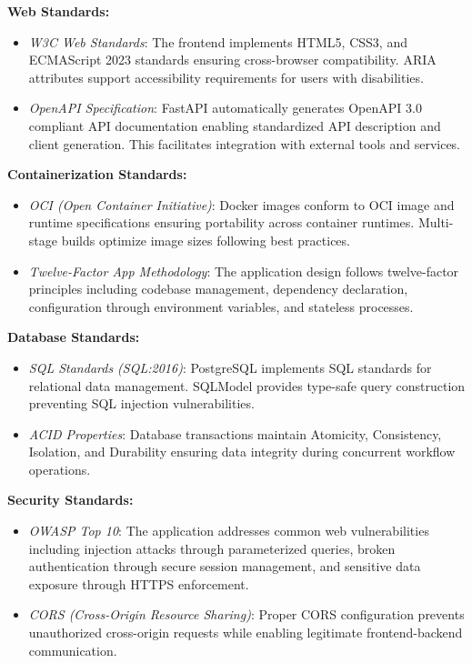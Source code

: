 \documentclass[12pt]{article}
\begin{document}
\textbf{Web Standards:}
\begin{itemize}
    \item \textit{W3C Web Standards}: The frontend implements HTML5, CSS3, and ECMAScript 2023 standards ensuring cross-browser compatibility. ARIA attributes support accessibility requirements for users with disabilities.
    
    \item \textit{OpenAPI Specification}: FastAPI automatically generates OpenAPI 3.0 compliant API documentation enabling standardized API description and client generation. This facilitates integration with external tools and services.
\end{itemize}

\textbf{Containerization Standards:}
\begin{itemize}
    \item \textit{OCI (Open Container Initiative)}: Docker images conform to OCI image and runtime specifications ensuring portability across container runtimes. Multi-stage builds optimize image sizes following best practices.
    
    \item \textit{Twelve-Factor App Methodology}: The application design follows twelve-factor principles including codebase management, dependency declaration, configuration through environment variables, and stateless processes.
\end{itemize}

\textbf{Database Standards:}
\begin{itemize}
    \item \textit{SQL Standards (SQL:2016)}: PostgreSQL implements SQL standards for relational data management. SQLModel provides type-safe query construction preventing SQL injection vulnerabilities.
    
    \item \textit{ACID Properties}: Database transactions maintain Atomicity, Consistency, Isolation, and Durability ensuring data integrity during concurrent workflow operations.
\end{itemize}

\textbf{Security Standards:}
\begin{itemize}
    \item \textit{OWASP Top 10}: The application addresses common web vulnerabilities including injection attacks through parameterized queries, broken authentication through secure session management, and sensitive data exposure through HTTPS enforcement.
    
    \item \textit{CORS (Cross-Origin Resource Sharing)}: Proper CORS configuration prevents unauthorized cross-origin requests while enabling legitimate frontend-backend communication.
\end{itemize}
\end{document}
